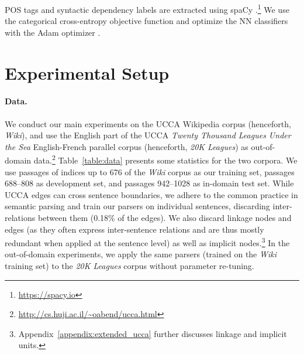 \documentclass[11pt,a4paper]{article}
\newcommand{\tabref}[1]{Table~\ref{#1}}
\begin{document}
POS tags and syntactic dependency labels are extracted using spaCy
\cite{honnibal-johnson:2015:EMNLP}.\footnote{\url{https://spacy.io}}
We use the categorical cross-entropy objective function and optimize the
NN classifiers with the Adam optimizer \cite{kingma2014adam}.



\section{Experimental Setup}\label{sec:exp_setup}

\paragraph{Data.}
We conduct our main experiments on the UCCA Wikipedia corpus (henceforth, \textit{Wiki}),
and use the English part of the UCCA \textit{Twenty Thousand Leagues Under the Sea}
English-French parallel corpus (henceforth, \textit{20K Leagues}) as
out-of-domain data.\footnote{\mbox{\url{http://cs.huji.ac.il/~oabend/ucca.html}}}
\tabref{table:data} presents some statistics for the two corpora.
We use passages of indices up to 676
of the \textit{Wiki} corpus as our training set, passages 688--808 as development set,
and passages 942--1028 as in-domain test set.
While UCCA edges can cross sentence boundaries, we adhere to the common
practice in semantic parsing and train our parsers on individual sentences,
discarding inter-relations between them (0.18\% of the edges).
We also discard linkage nodes and edges (as they often express inter-sentence
relations and are thus mostly redundant when applied at the sentence level)
as well as implicit nodes.\footnote{Appendix~\ref{appendix:extended_ucca}
further discusses linkage and implicit units.}
In the out-of-domain experiments, we apply the same parsers
(trained on the \textit{Wiki} training set) to the \textit{20K Leagues} corpus
without parameter re-tuning.
\end{document}
